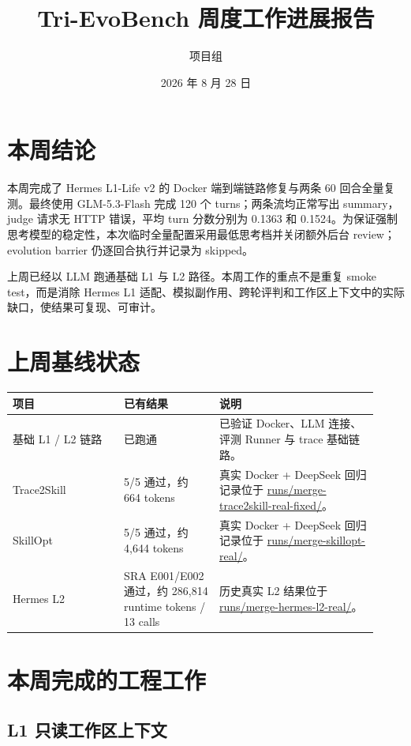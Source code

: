 \documentclass[11pt,a4paper]{ctexart}
\title{Tri-EvoBench 周度工作进展报告}
\author{项目组}
\date{2026 年 8 月 28 日}
\begin{document}
\maketitle
\pagestyle{plain}

\section{本周结论}

本周完成了 Hermes L1-Life v2 的 Docker 端到端链路修复与两条 60 回合全量复测。最终使用 GLM-5.3-Flash 完成 120 个 turns；两条流均正常写出 summary，judge 请求无 HTTP 错误，平均 turn 分数分别为 0.1363 和 0.1524。为保证强制思考模型的稳定性，本次临时全量配置采用最低思考档并关闭额外后台 review；evolution barrier 仍逐回合执行并记录为 skipped。

上周已经以 LLM 跑通基础 L1 与 L2 路径。本周工作的重点不是重复 smoke test，而是消除 Hermes L1 适配、模拟副作用、跨轮评判和工作区上下文中的实际缺口，使结果可复现、可审计。

\section{上周基线状态}

\begin{longtable}{p{0.28\linewidth}p{0.24\linewidth}p{0.40\linewidth}}
\toprule
项目 & 已有结果 & 说明 \\
\midrule
基础 L1 / L2 链路 & 已跑通 & 已验证 Docker、LLM 连接、评测 Runner 与 trace 基础链路。\\
Trace2Skill & 5/5 通过，约 664 tokens & 真实 Docker + DeepSeek 回归记录位于 \url{runs/merge-trace2skill-real-fixed/}。\\
SkillOpt & 5/5 通过，约 4,644 tokens & 真实 Docker + DeepSeek 回归记录位于 \url{runs/merge-skillopt-real/}。\\
Hermes L2 & SRA E001/E002 通过，约 286,814 runtime tokens / 13 calls & 历史真实 L2 结果位于 \url{runs/merge-hermes-l2-real/}。\\
\bottomrule
\end{longtable}

\section{本周完成的工程工作}

\subsection{L1 只读工作区上下文}
\end{document}

